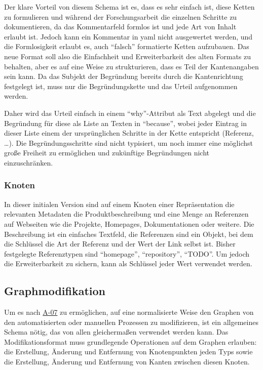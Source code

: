 Der klare Vorteil von diesem Schema ist es, dass es sehr einfach ist, diese Ketten zu formulieren und während der Forschungsarbeit die einzelnen Schritte zu dokumentieren, da das Kommentarfeld formlos ist und jede Art von Inhalt erlaubt ist.
Jedoch kann ein Kommentar in \acrshort{yaml} nicht ausgewertet werden, und die Formlosigkeit erlaubt es, auch \enquote{falsch} formatierte Ketten aufzubauen.
Das neue Format soll also die Einfachheit und Erweiterbarkeit des alten Formats zu behalten, aber es auf eine Weise zu strukturieren, dass es Teil der Kantenangaben sein kann.
Da das Subjekt der Begründung bereits durch die Kantenrichtung festgelegt ist, muss nur die Begründungskette und das Urteil aufgenommen werden.

Daher wird das Urteil einfach in einem \enquote{why}-Attribut als Text abgelegt und die Begründung für diese als Liste an Texten in \enquote{because}, wobei jeder Eintrag in dieser Liste einem der ursprünglichen Schritte in der Kette entspricht (Referenz, \ldots).
Die Begründungsschritte sind nicht typisiert, um noch immer eine möglichst große Freiheit zu ermöglichen und zukünftige Begründungen nicht einzuschränken.

\subsubsection{Knoten}

In dieser initialen Version sind auf einem Knoten einer Repräsentation die relevanten Metadaten die Produktbeschreibung und eine Menge an Referenzen auf Webseiten wie die Projekte, Homepages, Dokumentationen oder weitere.
Die Beschreibung ist ein einfaches Textfeld, die Referenzen sind ein Objekt, bei dem die Schlüssel die Art der Referenz und der Wert der Link selbst ist.
Bisher festgelegte Referenztypen sind \enquote{homepage}, \enquote{repository}, \enquote{TODO}. %
Um jedoch die Erweiterbarkeit zu sichern, kann als Schlüssel jeder Wert verwendet werden.

\subsection{Graphmodifikation}\label{subsec:model-graph-modification}

Um es nach \hyperref[subsec:req-manual-format-modification]{A-07} zu ermöglichen, auf eine normalisierte Weise den Graphen von den automatisierten oder manuellen Prozessen zu modifizieren, ist ein allgemeines Schema nötig, das von allen gleichermaßen verwendet werden kann.
Das Modifikationsformat muss grundlegende Operationen auf dem Graphen erlauben: die Erstellung, Änderung und Entfernung von Knotenpunkten jeden Typs sowie die Erstellung, Änderung und Entfernung von Kanten zwischen diesen Knoten.


